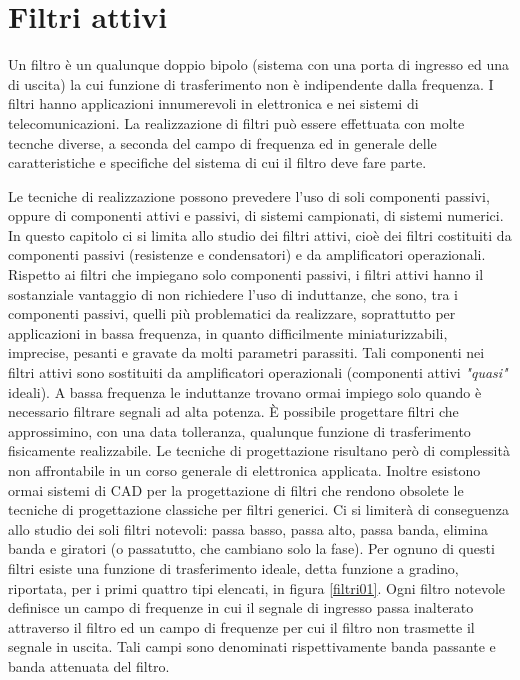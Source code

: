\documentclass[../main.tex]{subfiles}
\begin{document}
\clearpage
\thispagestyle{empty}
\vspace*{7cm}
\section{Filtri attivi}
\vspace*{1.5cm}


Un filtro è un qualunque doppio bipolo (sistema con una porta di ingresso ed una di uscita) la cui funzione di trasferimento non è indipendente dalla frequenza. I filtri hanno applicazioni innumerevoli in elettronica e nei sistemi di telecomunicazioni. La realizzazione di filtri può essere effettuata con molte tecnche diverse, a seconda del campo di frequenza ed in generale delle caratteristiche e specifiche del sistema di cui il filtro deve fare parte. 

Le tecniche di realizzazione possono prevedere l’uso di soli componenti passivi, oppure di componenti attivi e passivi, di sistemi campionati, di sistemi numerici. In questo capitolo ci si limita allo studio dei filtri attivi, cioè dei filtri costituiti da componenti passivi (resistenze e condensatori) e da amplificatori operazionali. Rispetto ai filtri che impiegano solo componenti passivi, i filtri attivi hanno il sostanziale vantaggio di non richiedere l’uso di induttanze, che sono, tra i componenti passivi, quelli più problematici da realizzare, soprattutto per applicazioni in bassa frequenza, in quanto difficilmente miniaturizzabili, imprecise, pesanti e gravate da molti parametri parassiti. 
Tali componenti nei filtri attivi sono sostituiti da amplificatori operazionali (componenti attivi \textit{"quasi"} ideali). A bassa frequenza le induttanze trovano ormai impiego solo quando è necessario filtrare segnali ad alta potenza. È possibile progettare filtri che approssimino, con una data tolleranza, qualunque funzione di trasferimento fisicamente realizzabile. Le tecniche di progettazione risultano però di complessità non affrontabile in un corso generale di elettronica applicata. Inoltre esistono ormai sistemi di CAD per la progettazione di filtri che rendono obsolete le tecniche di progettazione classiche per filtri generici. Ci si limiterà di conseguenza allo studio dei soli filtri notevoli: passa basso, passa alto, passa banda, elimina banda e giratori (o passatutto, che cambiano solo la fase). Per ognuno di questi filtri esiste una funzione di trasferimento ideale, detta funzione a gradino, riportata, per i primi quattro tipi elencati, in figura \ref{filtri01}. Ogni filtro notevole definisce un campo di frequenze in cui il segnale di ingresso passa inalterato attraverso il filtro ed un campo di frequenze per cui il filtro non trasmette il segnale in uscita. Tali campi sono denominati rispettivamente banda passante e banda attenuata del filtro.\\
\end{document}
